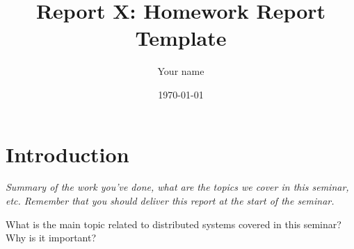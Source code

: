 \documentclass[a4paper, 11pt]{article}
\title{Report X: Homework Report Template}
\author{Your name}
\date{\today{}}
\begin{document}
\maketitle

\section{Introduction}

\textit{Summary of the work you've done, what are the topics we cover
  in this seminar, etc. Remember that you should deliver this report
  at the start of the seminar.}

What is the main topic related to distributed systems covered in this seminar?
Why is it important?

\begin{figure}[htbp]
  \begin{subfigure}[b]{0.48\textwidth}
\end{subfigure}
\end{figure}
\end{document}
